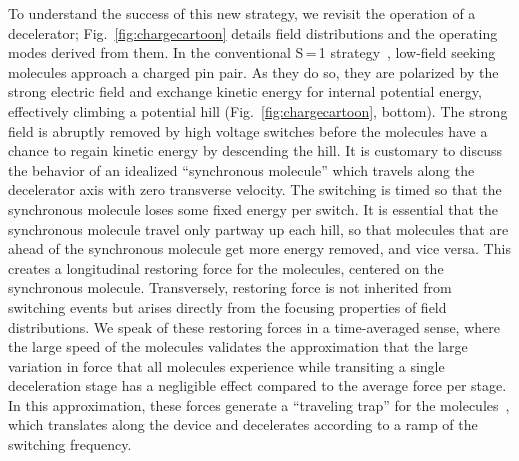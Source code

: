 \documentclass[%
 reprint,
 amsmath,amssymb,
 aps,
prl,
]{revtex4-1}
\begin{document}
To understand the success of this new strategy, we revisit the operation of a decelerator; Fig.~\ref{fig:chargecartoon} details field distributions and the operating modes derived from them.
In the conventional S\,=\,1 strategy~\cite{VanDeMeerakker2012}, low-field seeking molecules approach a charged pin pair.
As they do so, they are polarized by the strong electric field and exchange kinetic energy for internal potential energy, effectively climbing a potential hill (Fig.~\ref{fig:chargecartoon}, bottom).
The strong field is abruptly removed by high voltage switches before the molecules have a chance to regain kinetic energy by descending the hill.
It is customary to discuss the behavior of an idealized ``synchronous molecule'' which travels along the decelerator axis with zero transverse velocity.
The switching is timed so that the synchronous molecule loses some fixed energy per switch.
It is essential that the synchronous molecule travel only partway up each hill, so that molecules that are ahead of the synchronous molecule get more energy removed, and vice versa.
This creates a longitudinal restoring force for the molecules, centered on the synchronous molecule.
Transversely, restoring force is not inherited from switching events but arises directly from the focusing properties of field distributions.
We speak of these restoring forces in a time-averaged sense, where the large speed of the molecules validates the approximation that the large variation in force that all molecules experience while transiting a single deceleration stage has a negligible effect compared to the average force per stage.
In this approximation, these forces generate a ``traveling trap'' for the molecules~\cite{Bethlem2000}, which translates along the device and decelerates according to a ramp of the switching frequency.
\end{document}
